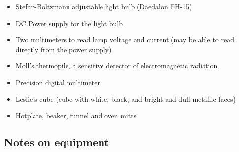 \documentclass{article}
\begin{document}
\begin{itemize}



\item Stefan-Boltzmann adjustable light bulb (Daedalon EH-15)

\item DC Power supply for the light bulb

\item Two multimeters to read lamp voltage and current (may be able to read directly from the power supply)

\item Moll's thermopile, a sensitive detector of
electromagnetic radiation

\item Precision digital multimeter


\item Leslie's cube (cube with white, black, and bright and
dull metallic faces)

\item Hotplate, beaker, funnel and oven mitts
\end{itemize}

\subsection{Notes on equipment}
\end{document}
